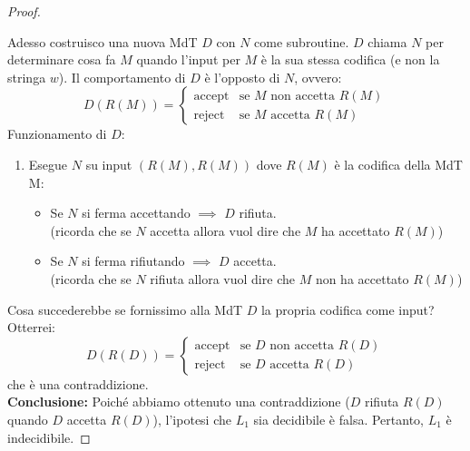\documentclass{article}  %
\theoremstyle{definition}
\begin{document}
\begin{esercizio}[Esercizio 2.2]
\begin{proof}
\begin{enumerate}
\begin{itemize}
			      \end{itemize}
		\end{enumerate}
		Adesso costruisco una nuova MdT $D$ con $N$ come subroutine. $D$ chiama $N$ per determinare cosa fa $M$ quando l'input per $M$ è la sua
		stessa codifica (e non la stringa $w$). Il comportamento di $D$ è l'opposto di $N$, ovvero:
		\[
			D(R(M)) =
			\begin{cases}
				\text{accept} & \text{se } M \text{ non accetta } R(M) \\
				\text{reject} & \text{se } M \text{  accetta } R(M)
			\end{cases}
		\]
		Funzionamento di $D$:
		\begin{enumerate}
			\item Esegue $N$ su input $(R(M),R(M))$ dove $R(M)$ è la codifica della MdT M:
			      \begin{itemize}
				      \item Se $N$ si ferma accettando $\implies$ $D$ rifiuta.\\
				            (ricorda che se $N$ accetta allora vuol dire che $M$ ha accettato $R(M)$)
				      \item Se $N$ si ferma rifiutando $\implies$ $D$ accetta. \\
				            (ricorda che se $N$ rifiuta allora vuol dire che $M$ non ha accettato $R(M)$)
			      \end{itemize}
		\end{enumerate}
		Cosa succederebbe se fornissimo alla MdT $D$ la propria codifica come input? Otterrei:
		\[
			D(R(D)) =
			\begin{cases}
				\text{accept} & \text{se } D \text{ non accetta } R(D) \\
				\text{reject} & \text{se } D \text{  accetta } R(D)
			\end{cases}
		\]
		che è una contraddizione.\\
		\textbf{Conclusione:} Poiché abbiamo ottenuto una contraddizione ($D$ rifiuta $R(D)$ quando $D$ accetta $R(D)$), l’ipotesi che $L_1$ sia decidibile è falsa. Pertanto, $L_1$ è indecidibile.
	\end{proof}
\end{esercizio}
\end{document}
